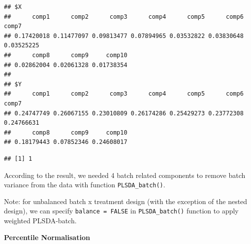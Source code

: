 \documentclass[
]{book}
\newenvironment{Shaded}{\begin{snugshade}}{\end{snugshade}}
\newcommand{\AttributeTok}[1]{\textcolor[rgb]{0.77,0.63,0.00}{#1}}
\newcommand{\DecValTok}[1]{\textcolor[rgb]{0.00,0.00,0.81}{#1}}
\newcommand{\FunctionTok}[1]{\textcolor[rgb]{0.00,0.00,0.00}{#1}}
\newcommand{\NormalTok}[1]{#1}
\newcommand{\OtherTok}[1]{\textcolor[rgb]{0.56,0.35,0.01}{#1}}
\newcommand{\SpecialCharTok}[1]{\textcolor[rgb]{0.00,0.00,0.00}{#1}}
\begin{document}
\begin{verbatim}
## $X
##      comp1      comp2      comp3      comp4      comp5      comp6      comp7 
## 0.17420018 0.11477097 0.09813477 0.07894965 0.03532822 0.03830648 0.03525225 
##      comp8      comp9     comp10 
## 0.02862004 0.02061328 0.01738354 
## 
## $Y
##      comp1      comp2      comp3      comp4      comp5      comp6      comp7 
## 0.24747749 0.26067155 0.23010809 0.26174286 0.25429273 0.23772308 0.24766631 
##      comp8      comp9     comp10 
## 0.18179443 0.07852346 0.24608017
\end{verbatim}

\begin{Shaded}
\end{Shaded}

\begin{verbatim}
## [1] 1
\end{verbatim}

According to the result, we needed 4 batch related components to remove batch variance from the data with function \texttt{PLSDA\_batch()}.

\begin{Shaded}
\end{Shaded}

Note: for unbalanced batch x treatment design (with the exception of the nested design), we can specify \texttt{balance\ =\ FALSE} in \texttt{PLSDA\_batch()} function to apply weighted PLSDA-batch.

\textbf{Percentile Normalisation}
\end{document}
